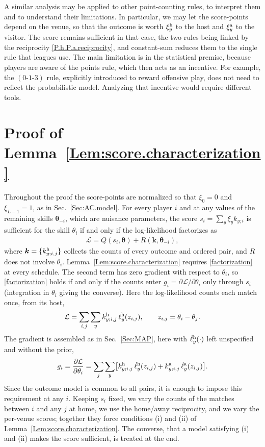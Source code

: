 \documentclass[letterpaper,12pt]{article}
\newcommand{\tnr}[1]{{\textnormal{#1}}}
\newcommand{\bk}{\boldsymbol{k}}
\newcommand{\btheta}{\boldsymbol{\theta}}
\newcommand{\set}[1]{\{#1\}}
\newcommand{\cd}{\cdot}
\begin{document}
A similar analysis may be applied to other point-counting rules, to interpret them and to understand their limitations. In particular, we may let the score-points depend on the venue, so that the outcome is worth $\xi^\tnr{h}_y$ to the host and $\xi^\tnr{a}_y$ to the visitor. The score remains sufficient in that case, the two rules being linked by the reciprocity \eqref{P.h.P.a.reciprocity}, and constant-sum reduces them to the single rule that leagues use. The main limitation is in the statistical premise, because players are aware of the points rule, which then acts as an incentive. For example, the $(0\text{-}1\text{-}3)$ rule, explicitly introduced to reward offensive play, does not need to reflect the probabilistic model. Analyzing that incentive would require different tools.

\appendix
\section{Proof of Lemma~\ref{Lem:score.characterization}}\label{App:proof}

Throughout the proof the score-points are normalized so that $\xi_0=0$ and $\xi_{L-1}=1$, as in Sec.~\ref{Sec:AC.model}. For every player $i$ and at any values of the remaining skills $\btheta_{-i}$, which are nuisance parameters, the score $s_i=\sum_y\xi_y k_{y;i}$ is sufficient for the skill $\theta_i$ if and only if the log-likelihood factorizes as
\begin{align}
\label{factorization}
    \mathcal L = Q(s_i,\btheta)+R(\bk,\btheta_{-i}),
\end{align}
where $\bk=\set{k^\tnr{h}_{y;i,j}}$ collects the counts of every outcome and ordered pair, and $R$ does not involve $\theta_i$. Lemma~\ref{Lem:score.characterization} requires \eqref{factorization} at every schedule. The second term has zero gradient with respect to $\theta_i$, so \eqref{factorization} holds if and only if the counts enter $g_i=\partial\mathcal L/\partial\theta_i$ only through $s_i$ (integration in $\theta_i$ giving the converse). Here the log-likelihood counts each match once, from its host,
\begin{align}
    \mathcal L=\sum_{i,j}\sum_y k^\tnr{h}_{y;i,j}\,\ell^\tnr{h}_y(z_{i,j}),\qquad z_{i,j}=\theta_i-\theta_j.
\end{align}
The gradient is assembled as in Sec.~\ref{Sec:MAP}, here with $\dot\ell^\tnr{h}_y(\cd)$ left unspecified and without the prior,
\begin{align}
\label{Gi.gradient}
    g_i=\frac{\partial\mathcal L}{\partial\theta_i}
    =\sum_{j}\sum_y \bigl[k^\tnr{h}_{y;i,j}\,\dot\ell^\tnr{h}_y(z_{i,j})
    +k^\tnr{a}_{y;i,j}\,\dot\ell^\tnr{a}_y(z_{i,j})\bigr].
\end{align}
Since the outcome model is common to all pairs, it is enough to impose this requirement at any $i$. Keeping $s_i$ fixed, we vary the counts of the matches between $i$ and any $j$ at home, we use the home/away reciprocity, and we vary the per-venue scores; together they force conditions (i) and (ii) of Lemma~\ref{Lem:score.characterization}. The converse, that a model satisfying (i) and (ii) makes the score sufficient, is treated at the end.
\end{document}

